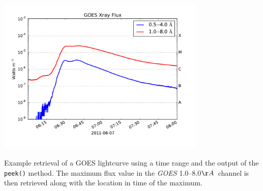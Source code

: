 \begin{listing}[H]
\begin{center}
\includegraphics[width=10cm]{goes_lightcurve.pdf}
\end{center}
\caption{Example retrieval of a GOES lightcurve
using a time range and the output of the 
\texttt{peek()} method. The maximum flux value in the \textit{GOES} 1.0--8.0$\AA$\ channel 
is then retrieved along with the location in time of the maximum.}
\label{code:goes_lc}
\end{listing}